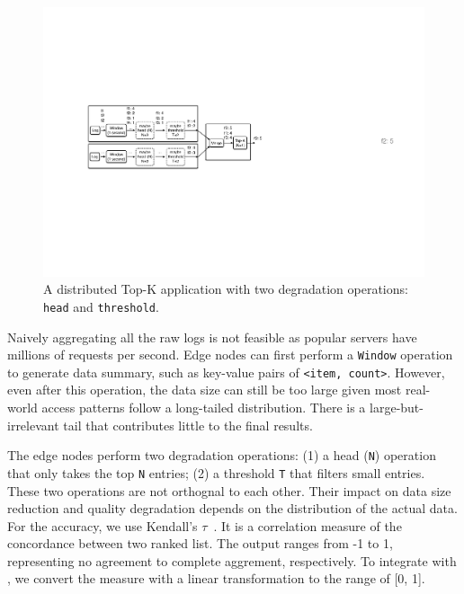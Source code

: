 \begin{figure}
  \centering
  \includegraphics[width=\columnwidth]{figures/topk.pdf}
  \caption{A distributed Top-K application with two degradation operations:
    \texttt{head} and \texttt{threshold}.}
  \label{fig:topk}
\end{figure}

Naively aggregating all the raw logs is not feasible as popular servers have
millions of requests per second. Edge nodes can first perform a \texttt{Window}
operation to generate data summary, such as key-value pairs of \texttt{<item,
  count>}. However, even after this operation, the data size can still be too
large given most real-world access patterns follow a long-tailed
distribution. There is a large-but-irrelevant tail that contributes little to
the final results.

The edge nodes perform two degradation operations: (1) a head (\texttt{N})
operation that only takes the top \texttt{N} entries; (2) a threshold \texttt{T}
that filters small entries. These two operations are not orthognal to each
other. Their impact on data size reduction and quality degradation depends on
the distribution of the actual data. For the accuracy, we use Kendall's
$\tau$~\cite{abdi2007kendall}. It is a correlation measure of the concordance
between two ranked list. The output ranges from -1 to 1, representing no
agreement to complete aggrement, respectively. To integrate with \sysname{}, we
convert the measure with a linear transformation to the range of [0, 1].

